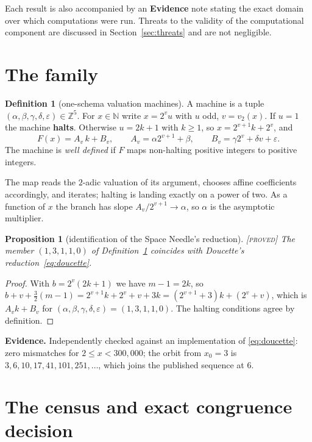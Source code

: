 \documentclass[11pt]{article}
\newtheorem{proposition}[theorem]{Proposition}
\theoremstyle{definition}
\newtheorem{definition}[theorem]{Definition}
\theoremstyle{remark}
\newenvironment{evidence}
  {\par\smallskip\noindent\footnotesize\textbf{Evidence.}}
  {\par\smallskip}
\newcommand{\Z}{\mathbb{Z}}
\newcommand{\N}{\mathbb{N}}
\newcommand{\vp}[1]{v_{#1}}
\newcommand{\Proved}{\textsc{[proved]}}
\begin{document}
Each result is also accompanied by an \textbf{Evidence} note stating the exact
domain over which computations were run.  Threats to the validity of the
computational component are discussed in Section~\ref{sec:threats} and are not
negligible.

\section{The family}
\label{sec:family}

\begin{definition}[one-schema valuation machines]
\label{def:family}
A machine is a tuple $(\alpha,\beta,\gamma,\delta,\varepsilon)\in\Z^5$.  For
$x\in\N$ write $x=2^{v}u$ with $u$ odd, $v=\vp{2}(x)$.  If $u=1$ the machine
\textbf{halts}.  Otherwise $u=2k+1$ with $k\ge 1$, so $x=2^{v+1}k+2^{v}$, and
\[
F(x)=A_v\,k+B_v,\qquad
A_v=\alpha 2^{v+1}+\beta,\qquad
B_v=\gamma 2^{v}+\delta v+\varepsilon .
\]
The machine is \emph{well defined} if $F$ maps non-halting positive integers to
positive integers.
\end{definition}

The map reads the $2$-adic valuation of its argument, chooses affine
coefficients accordingly, and iterates; halting is landing exactly on a power
of two.  As a function of $x$ the branch has slope $A_v/2^{v+1}\to\alpha$, so
$\alpha$ is the asymptotic multiplier.

\begin{proposition}[identification of the Space Needle's reduction]
\label{prop:needle-id}
\Proved{}\; The member $(1,3,1,1,0)$ of Definition~\ref{def:family} coincides
with Doucette's reduction~\eqref{eq:doucette}.
\end{proposition}

\begin{proof}
With $b=2^{v}(2k+1)$ we have $m-1=2k$, so
$b+v+\frac32(m-1)=2^{v+1}k+2^{v}+v+3k=(2^{v+1}+3)k+(2^{v}+v)$, which is
$A_vk+B_v$ for $(\alpha,\beta,\gamma,\delta,\varepsilon)=(1,3,1,1,0)$.  The
halting conditions agree by definition.
\end{proof}

\begin{evidence}
Independently checked against an implementation of \eqref{eq:doucette}: zero
mismatches for $2\le x<300{,}000$; the orbit from $x_0=3$ is
$3,6,10,17,41,101,251,\dots$, which joins the published sequence at $6$.
\end{evidence}

\section{The census and exact congruence decision}
\label{sec:census}
\end{document}
